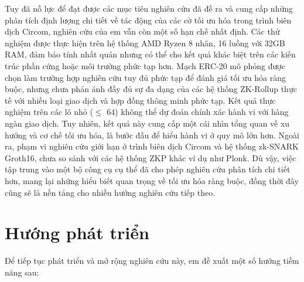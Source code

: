 Tuy đã nỗ lực để đạt được các mục tiêu nghiên cứu đã đề ra và cung cấp những phân tích định lượng chi tiết về tác động của các cờ tối ưu hóa trong trình biên dịch Circom, nghiên cứu của em vẫn còn một số hạn chế nhất định. Các thử nghiệm được thực hiện trên hệ thống AMD Ryzen 8 nhân, 16 luồng với 32GB RAM, đảm bảo tính nhất quán nhưng có thể cho kết quả khác biệt trên các kiến trúc phần cứng hoặc môi trường phức tạp hơn. Mạch ERC-20 mô phỏng được chọn làm trường hợp nghiên cứu tuy đủ phức tạp để đánh giá tối ưu hóa ràng buộc, nhưng chưa phản ánh đầy đủ sự đa dạng của các hệ thống ZK-Rollup thực tế với nhiều loại giao dịch và hợp đồng thông minh phức tạp. Kết quả thực nghiệm trên các lô nhỏ ($\leq$ 64) không thể dự đoán chính xác hành vi với hàng ngàn giao dịch. Tuy nhiên, kết quả này cung cấp một cái nhìn tổng quan về xu hướng và cơ chế tối ưu hóa, là bước đầu để hiểu hành vi ở quy mô lớn hơn. Ngoài ra, phạm vi nghiên cứu giới hạn ở trình biên dịch Circom và hệ thống zk-SNARK Groth16, chưa so sánh với các hệ thống ZKP khác ví dụ như Plonk. Dù vậy, việc tập trung vào một bộ công cụ cụ thể đã cho phép nghiên cứu phân tích chi tiết hơn, mang lại những hiểu biết quan trọng về tối ưu hóa ràng buộc, đồng thời đây cũng sẽ là nền tảng cho nhiều hướng nghiên cứu tiếp theo.


\section{Hướng phát triển}
Để tiếp tục phát triển và mở rộng nghiên cứu này, em đề xuất một số hướng tiềm năng sau:

